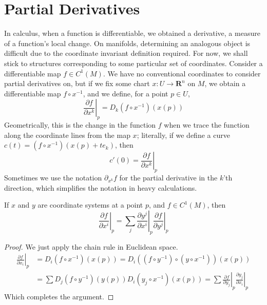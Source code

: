 \section{Partial Derivatives}

In calculus, when a function is differentiable, we obtained a derivative, a measure of a function's local change. On manifolds, determining an analogous object is difficult due to the coordinate invariant definition required. For now, we shall stick to structures corresponding to some particular set of coordinates. Consider a differentiable map $f \in C^1(M)$. We have no conventional coordinates to consider partial derivatives on, but if we fix some chart $x:U \to \mathbf{R}^n$ on $M$, we obtain a differentiable map $f \circ x^{-1}$, and we define, for a point $p \in U$,
%
\[ \left. \frac{\partial f}{\partial x^k} \right|_p = D_k(f \circ x^{-1})(x(p)) \]
%
Geometrically, this is the change in the function $f$ when we trace the function along the coordinate lines from the map $x$; literally, if we define a curve $c(t) = (f \circ x^{-1})(x(p) + te_k)$, then
%
\[ c'(0) = \left.\frac{\partial f}{\partial x^k}\right|_p \]
%
Sometimes we use the notation $\partial_{x^k} f$ for the partial derivative in the $k$'th direction, which simplifies the notation in heavy calculations.

\begin{theorem}
    If $x$ and $y$ are coordinate systems at a point $p$, and $f \in C^1(M)$, then
    \[ \left. \frac{\partial f}{\partial x^i} \right|_p = \sum_j \left. \frac{\partial y^j}{\partial x^i} \right|_p \left. \frac{\partial f}{\partial y^j} \right|_p \]
\end{theorem}
\begin{proof}
    We just apply the chain rule in Euclidean space.
    \begin{align*}
        \left.\frac{\partial f}{\partial x_i}\right|_p &= D_i(f \circ x^{-1})(x(p)) = D_i((f \circ y^{-1}) \circ (y \circ x^{-1}))(x(p))\\
        &= \sum D_j(f \circ y^{-1})(y(p)) D_i(y_j \circ x^{-1})(x(p)) = \sum \left.\frac{\partial f}{\partial y_j}\right|_p \left.\frac{\partial y_j}{\partial x_i}\right|_p
    \end{align*}
    Which completes the argument.
\end{proof}

